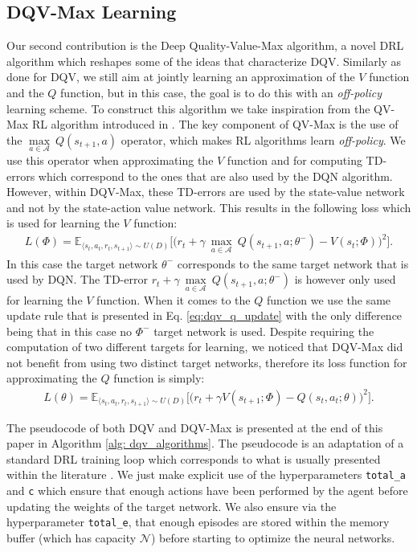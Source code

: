 \subsection{DQV-Max Learning}
Our second contribution is the Deep Quality-Value-Max algorithm, a novel DRL algorithm which reshapes some of the ideas that characterize DQV. Similarly as done for DQV, we still aim at jointly learning an approximation of the $V$ function and the $Q$ function, but in this case, the goal is to do this with an \textit{off-policy} learning scheme. To construct this algorithm we take inspiration from the QV-Max RL algorithm introduced in \cite{wiering2009qv}. The key component of QV-Max is the use of the $\underset{a\in \mathcal{A}}{\max}\: Q(s_{t+1}, a)$ operator, which makes RL algorithms learn \textit{off-policy}. We use this operator when approximating the $V$ function and for computing TD-errors which correspond to the ones that are also used by the DQN algorithm. However, within DQV-Max, these TD-errors are used by the state-value network and not by the state-action value network. This results in the following loss which is used for learning the $V$ function:
\begin{multline}
L(\Phi) = \mathds{E}_{\langle s_{t},a_{t},r_{t},s_{t+1}\rangle\sim U(D)} \bigg[\big(r_{t} + \gamma \: \underset{a\in \mathcal{A}}{\max}\: Q(s_{t+1}, a; \theta^{-}) - V(s_{t}; \Phi)\big)^{2}\bigg].
\label{eq:dqv_max_v}
\end{multline}
In this case the target network $\theta^{-}$ corresponds to the same target network that is used by DQN. The TD-error $r_{t} + \gamma \: \underset{a\in \mathcal{A}}{\max}\: Q(s_{t+1}, a; \theta^{-})$ is however only used for learning the $V$ function. When it comes to the $Q$ function we use the same update rule that is presented in Eq. \ref{eq:dqv_q_update} with the only difference being that in this case no $\Phi^{-}$ target network is used. Despite requiring the computation of two different targets for learning, we noticed that DQV-Max did not benefit from using two distinct target networks, therefore its loss function for approximating the $Q$ function is simply:
\begin{multline}
    L(\theta) = \mathds{E}_{\langle s_{t},a_{t},r_{t},s_{t+1}\rangle\sim U(D)} \bigg[\big(r_{t} + \gamma V(s_{t+1}; \Phi) - Q(s_{t}, a_{t}; \theta)\big)^{2}\bigg].
    \label{eq:dqv_max_q}
\end{multline}

The pseudocode of both DQV and DQV-Max is presented at the end of this paper in Algorithm \ref{alg: dqv_algorithms}. The pseudocode is an adaptation of a standard DRL training loop which corresponds to what is usually presented within the literature \cite{mnih2015human}. We just make explicit use of the hyperparameters \texttt{total\_a} and \texttt{c} which ensure that enough actions have been performed by the agent before updating the weights of the target network. We also ensure via the hyperparameter \texttt{total\_e}, that enough episodes are stored within the memory buffer (which has capacity $\mathcal{N}$) before starting to optimize the neural networks. 


